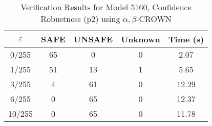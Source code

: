 \begin{table}[htbp]
\centering
\caption{Verification Results for Model 5160, Confidence Robustness (p2) using $\alpha,\beta$-CROWN}
\label{tab:model5160_p2_abcrown}
\begin{tabular}{|c|c|c|c|c|}
\hline
$\varepsilon$ & SAFE & UNSAFE & Unknown & Time (s) \\ \hline
0/255 & 65 & 0 & 0 & 2.07 \\ \hline
1/255 & 51 & 13 & 1 & 5.65 \\ \hline
3/255 & 4 & 61 & 0 & 12.29 \\ \hline
6/255 & 0 & 65 & 0 & 12.37 \\ \hline
10/255 & 0 & 65 & 0 & 11.78 \\ \hline
\end{tabular}
\end{table}
